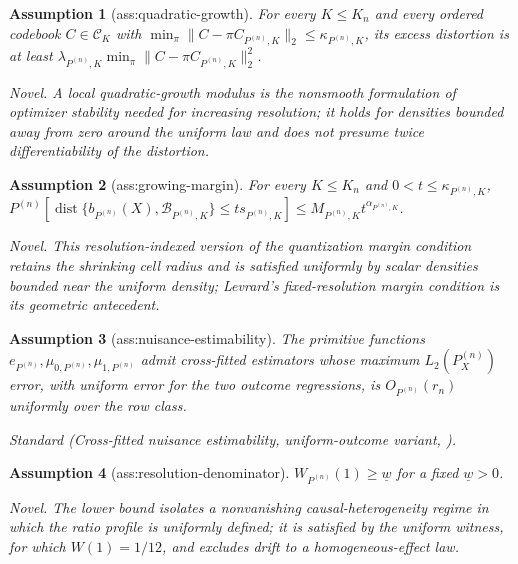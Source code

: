 \documentclass{article}
\newtheorem{assumption}{Assumption}
\begin{document}
\begin{assumption}[ass:quadratic-growth]\label{ass:quadratic-growth}
For every \(K\le K_n\) and every ordered codebook \(C\in\mathcal C_K\) with \(\min_{\pi}\|C-\pi C_{P^{(n)},K}\|_2\le\kappa_{P^{(n)},K}\), its excess distortion is at least \(\lambda_{P^{(n)},K}\min_{\pi}\|C-\pi C_{P^{(n)},K}\|_2^2\).
\par\smallskip\noindent\emph{Novel.} A local quadratic-growth modulus is the nonsmooth formulation of optimizer stability needed for increasing resolution; it holds for densities bounded away from zero around the uniform law and does not presume twice differentiability of the distortion.
\end{assumption}

\begin{assumption}[ass:growing-margin]\label{ass:growing-margin}
For every \(K\le K_n\) and \(0<t\le\kappa_{P^{(n)},K}\), \(P^{(n)}[\operatorname{dist}\{b_{P^{(n)}}(X),\mathcal B_{P^{(n)},K}\}\le t s_{P^{(n)},K}]\le M_{P^{(n)},K}t^{\alpha_{P^{(n)},K}}\).
\par\smallskip\noindent\emph{Novel.} This resolution-indexed version of the quantization margin condition retains the shrinking cell radius and is satisfied uniformly by scalar densities bounded near the uniform density; Levrard's fixed-resolution margin condition is its geometric antecedent.
\end{assumption}

\begin{assumption}[ass:nuisance-estimability]\label{ass:nuisance-estimability}
The primitive functions \(e_{P^{(n)}},\mu_{0,P^{(n)}},\mu_{1,P^{(n)}}\) admit cross-fitted estimators whose maximum \(L_2(P_X^{(n)})\) error, with uniform error for the two outcome regressions, is \(O_{P^{(n)}}(r_n)\) uniformly over the row class.
\par\smallskip\noindent\emph{Standard} (Cross-fitted nuisance estimability, uniform-outcome variant, \cite{KimKimKennedy2026}).
\end{assumption}

\begin{assumption}[ass:resolution-denominator]\label{ass:resolution-denominator}
\(W_{P^{(n)}}(1)\ge\underline w\) for a fixed \(\underline w>0\).
\par\smallskip\noindent\emph{Novel.} The lower bound isolates a nonvanishing causal-heterogeneity regime in which the ratio profile is uniformly defined; it is satisfied by the uniform witness, for which \(W(1)=1/12\), and excludes drift to a homogeneous-effect law.
\end{assumption}
\end{document}
